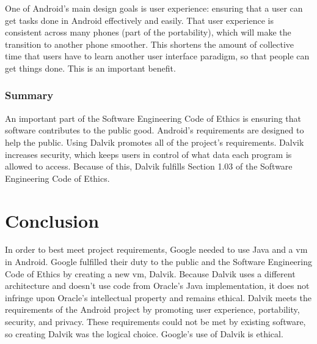 \documentclass[11pt]{article}
\begin{document}
\begin{multicols}{2}
One of Android's main design goals is user experience: ensuring that a user can
get tasks done in Android effectively and easily.  That user experience is
consistent across many phones (part of the portability), which will make the
transition to another phone smoother.  This shortens the amount of collective
time that users have to learn another user interface paradigm, so that people
can get things done.  This is an important benefit.


\subsubsection{Summary} %
\label{ssub:public-summary}

An important part of the Software Engineering Code of Ethics is ensuring that
software contributes to the public good.  Android's requirements are designed to
help the public.  Using Dalvik promotes all of the project's requirements.
Dalvik increases security, which keeps users in control of what data each
program is allowed to access.  Because of this, Dalvik fulfills Section 1.03 of
the Software Engineering Code of Ethics.




\section{Conclusion} %
\label{sec:conclusion}

In order to best meet project requirements, Google needed to use Java and a
\gls{vm} in Android.  Google fulfilled their duty to the public and the Software
Engineering Code of Ethics by creating a new \gls{vm}, Dalvik.  Because Dalvik
uses a different architecture and doesn't use code from Oracle's Java
implementation, it does not infringe upon Oracle's intellectual property and
remains ethical.  Dalvik meets the requirements of the Android project by
promoting user experience, portability, security, and privacy.  These
requirements could not be met by existing software, so creating Dalvik was the
logical choice.  Google's use of Dalvik is ethical.


\appendix

\printglossaries

\end{multicols}
\newpage


{}
\nocite{*}


\end{document}
